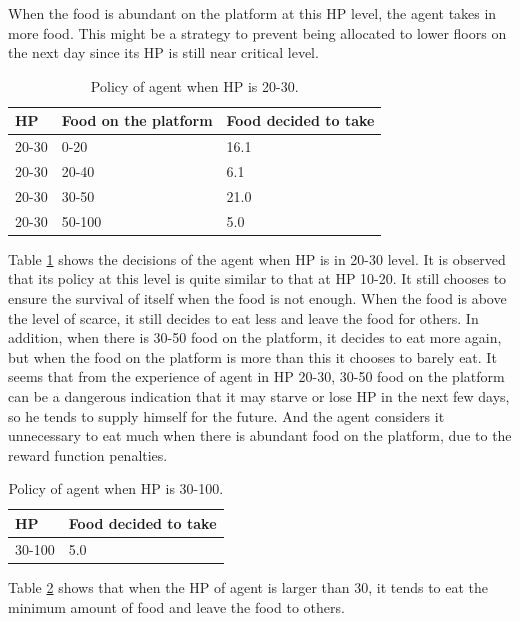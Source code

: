 When the food is abundant on the platform at this HP level, the agent takes in more food. This might be a strategy to prevent being allocated to lower floors on the next day since its HP is still near critical level.

\begin{table}[]
\centering
\caption{Policy of agent when HP is 20-30.}
\label{2030-team2}
\begin{tabular}{@{}lll@{}}
\toprule
HP    & Food on the platform & Food decided to take \\ \midrule
20-30 & 0-20                 & 16.1                 \\
20-30 & 20-40                & 6.1                  \\
20-30 & 30-50                & 21.0                 \\
20-30 & 50-100               & 5.0                  \\ \bottomrule
\end{tabular}
\end{table}

Table \ref{2030-team2} shows the decisions of the agent when HP is in 20-30 level. It is observed that its policy at this level is quite similar to that at HP 10-20. It still chooses to ensure the survival of itself when the food is not enough. When the food is above the level of scarce, it still decides to eat less and leave the food for others. In addition, when there is 30-50 food on the platform, it decides to eat more again, but when the food on the platform is more than this it chooses to barely eat. It seems that from the experience of agent in HP 20-30, 30-50 food on the platform can be a dangerous indication that it may starve or lose HP in the next few days, so he tends to supply himself for the future. And the agent considers it unnecessary to eat much when there is abundant food on the platform, due to the reward function penalties.

\begin{table}[]
\centering
\caption{Policy of agent when HP is 30-100.}
\label{30100-team2}
\begin{tabular}{@{}ll@{}}
\toprule
HP     & Food decided to take \\ \midrule
30-100 & 5.0                  \\ \bottomrule
\end{tabular}
\end{table}

Table \ref{30100-team2} shows that when the HP of agent is larger than 30, it tends to eat the minimum amount of food and leave the food to others.

